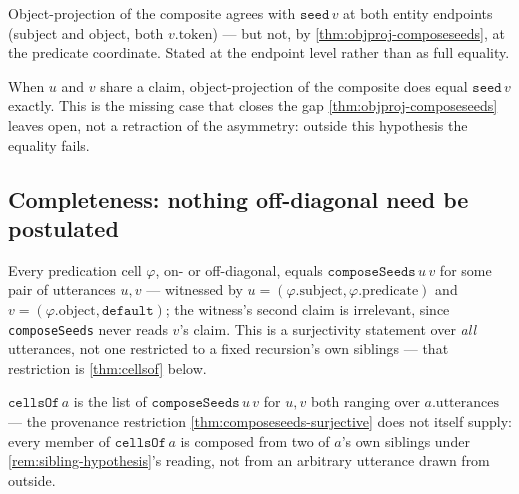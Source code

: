 \begin{proposition}\label{thm:objproj-composeseeds-endpoints}\leanok{}
Object-projection of the composite agrees with \(\texttt{seed}\,v\) at both
entity endpoints (subject and object, both \(v.\mathrm{token}\)) --- but not,
by \cref{thm:objproj-composeseeds}, at the predicate coordinate. Stated at the
endpoint level rather than as full equality.
\end{proposition}

\begin{proposition}\label{thm:objproj-composeseeds-of-claim-eq}\leanok{}
When \(u\) and \(v\) share a claim, object-projection of the composite does
equal \(\texttt{seed}\,v\) exactly. This is the missing case that closes the
gap \cref{thm:objproj-composeseeds} leaves open, not a retraction of the
asymmetry: outside this hypothesis the equality fails.
\end{proposition}

\subsection*{Completeness: nothing off-diagonal need be postulated}

\begin{theorem}\label{thm:composeseeds-surjective}\leanok{}
Every predication cell \(\varphi\), on- or off-diagonal, equals
\(\texttt{composeSeeds}\,u\,v\) for some pair of utterances \(u, v\) ---
witnessed by \(u = (\varphi.\mathrm{subject}, \varphi.\mathrm{predicate})\)
and \(v = (\varphi.\mathrm{object}, \mathtt{default})\); the witness's second
claim is irrelevant, since \texttt{composeSeeds} never reads \(v\)'s claim.
This is a surjectivity statement over \emph{all} utterances, not one
restricted to a fixed recursion's own siblings --- that restriction is
\cref{thm:cellsof} below.
\end{theorem}

\begin{definition}\label{thm:cellsof}\leanok{}
\(\texttt{cellsOf}\,a\) is the list of \(\texttt{composeSeeds}\,u\,v\) for
\(u, v\) both ranging over \(a.\mathrm{utterances}\) --- the provenance
restriction \cref{thm:composeseeds-surjective} does not itself supply: every
member of \(\texttt{cellsOf}\,a\) is composed from two of \(a\)'s own
siblings under \cref{rem:sibling-hypothesis}'s reading, not from an arbitrary
utterance drawn from outside.
\end{definition}

